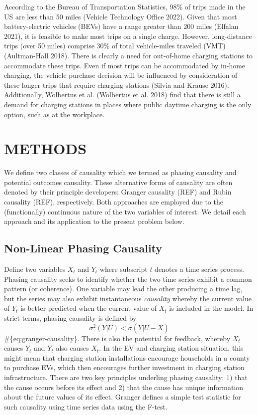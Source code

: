 \documentclass[
  letterpaper,
  DIV=11,
  numbers=noendperiod]{scrartcl}
\begin{document}
According to the Bureau of Transportation Statistics, 98\% of trips made
in the US are less than 50 miles (Vehicle Technology Office 2022). Given
that most battery-electric vehicles (BEVs) have a range greater than 200
miles (Elfalan 2021), it is feasible to make most trips on a single
charge. However, long-distance trips (over 50 miles) comprise 30\% of
total vehicle-miles traveled (VMT) (Aultman-Hall 2018). There is clearly
a need for out-of-home charging stations to accommodate these trips.
Even if most trips can be accommodated by in-home charging, the vehicle
purchase decision will be influenced by consideration of these longer
trips that require charging stations (Silvia and Krause 2016).
Additionally, Wolbertus et al. (Wolbertus et al. 2018) find that there
is still a demand for charging stations in places where public daytime
charging is the only option, such as at the workplace.

\hypertarget{methods}{%
\section{METHODS}\label{methods}}

We define two classes of causality which we termed as phasing causality
and potential outcomes causality. These alternative forms of causality
are often denoted by their principle developers: Granger causality (REF)
and Rubin causality (REF), respectively. Both approaches are employed
due to the (functionally) continuous nature of the two variables of
interest. We detail each approach and its application to the present
problem below.

\hypertarget{non-linear-phasing-causality}{%
\subsection{Non-Linear Phasing
Causality}\label{non-linear-phasing-causality}}

Define two variables \(X_t\) and \(Y_t\) where subscript \(t\) denotes a
time series process. Phasing causality seeks to identify whether the two
time series exhibit a common pattern (or coherence). One variable may
lead the other producing a time lag, but the series may also exhibit
instantaneous \emph{causality} whereby the current value of \(Y_t\) is
better predicted when the current value of \(X_t\) is included in the
model. In strict terms, phasing causality is defined by
\[\sigma^2(Y|U)<\sigma(Y|\overline{U-X})\] \#\{eq:granger-causality\}.
There is also the potential for feedback, whereby \(X_t\) causes \(Y_t\)
and \(Y_t\) also causes \(X_t\). In the EV and charging station
situation, this might mean that charging station installations encourage
households in a county to purchase EVs, which then encourages further
investment in charging station infrastructure. There are two key
principles underling phasing causality: 1) that the cause occurs before
its effect and 2) that the cause has unique information about the future
values of its effect. Granger defines a simple test statistic for such
causality using time series data using the F-test.
\end{document}
